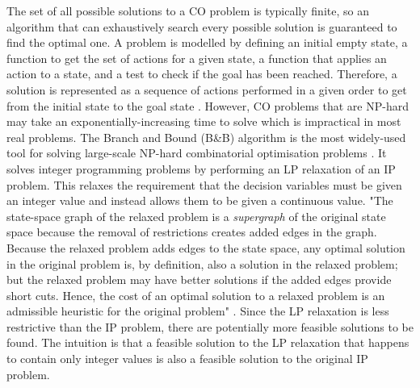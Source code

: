 The set of all possible solutions to a CO problem is typically finite, so an algorithm that can exhaustively search every possible solution is guaranteed to find the optimal one. A problem is modelled by defining an initial empty state, a function to get the set of actions for a given state, a function that applies an action to a state, and a test to check if the goal has been reached. Therefore, a solution is represented as a sequence of actions performed in a given order to get from the initial state to the goal state \citep{russell2016artificial}. However, CO problems that are NP-hard \citep{garey1979computers} may take an exponentially-increasing time to solve which is impractical in most real problems. The Branch and Bound (B\&B) algorithm \citep{land1960automatic} is the most widely-used tool for solving large-scale NP-hard combinatorial optimisation problems \citep{clausen1999branch}. It solves integer programming problems by performing an LP relaxation of an IP problem. This relaxes the requirement that the decision variables must be given an integer value and instead allows them to be given a continuous value. "The state-space graph of the relaxed problem is a \emph{supergraph} of the original state space because the removal of restrictions creates added edges in the graph. Because the relaxed problem adds edges to the state space, any optimal solution in the original problem is, by definition, also a solution in the relaxed problem; but the relaxed problem may have better solutions if the added edges provide short cuts. Hence, the cost of an optimal solution to a relaxed problem is an admissible heuristic for the original problem" \citep{russell2016artificial}. Since the LP relaxation is less restrictive than the IP problem, there are potentially more feasible solutions to be found. The intuition is that a feasible solution to the LP relaxation that happens to contain only integer values is also a feasible solution to the original IP problem.

